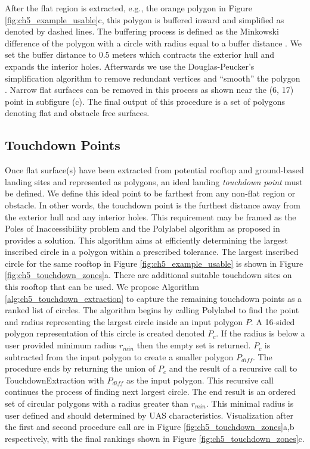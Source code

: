 After the flat region is extracted, e.g., the orange polygon in Figure \ref{fig:ch5_example_usable}c, this polygon is buffered inward and simplified as denoted by dashed lines. The buffering process is defined as the Minkowski difference of the polygon with a circle with radius equal to a buffer distance \cite{agarwal2002polygon}. We set the buffer distance to 0.5 meters which contracts the exterior hull and expands the interior holes.  Afterwards we use the Douglas-Peucker's simplification algorithm to remove redundant vertices and ``smooth'' the polygon \cite{douglas_algorithms_1973}.
Narrow flat surfaces can be removed in this process as shown near the (6, 17) point in subfigure (c). The final output of this procedure is a set of polygons denoting flat and obstacle free surfaces.

\subsection{Touchdown Points}\label{sec:ch5_method_circle}\label{sec:ch5_touchdown}
Once flat surface(s) have been extracted from potential rooftop and ground-based landing sites and represented as polygons, an ideal landing \emph{touchdown point} must be defined. We define this ideal point to be farthest from any non-flat region or obstacle. In other words, the touchdown point is the furthest distance away from the exterior hull and any interior holes. This requirement may be framed as the Poles of Inaccessibility problem \cite{garcia-castellanos_poles_2007} and the Polylabel algorithm as proposed in \cite{noauthor_github_2018-3} provides a solution. This algorithm aims at efficiently determining the largest inscribed circle in a polygon within a prescribed tolerance. The largest inscribed circle for the same rooftop in Figure \ref{fig:ch5_example_usable} is shown in Figure \ref{fig:ch5_touchdown_zones}a. 
There are additional suitable touchdown sites on this rooftop that can be used. We propose Algorithm \ref{alg:ch5_touchdown_extraction} to capture the remaining touchdown points as a ranked list of circles. The algorithm begins by calling Polylabel to find the point and radius representing the largest circle inside an input polygon $P$.  A 16-sided polygon representation of this circle is created denoted $P_c$. If the radius is below a user provided minimum radius $r_{min}$ then the empty set is returned. $P_c$ is subtracted from the input polygon to create a smaller polygon $P_{diff}$. The procedure ends by returning the union of $P_c$ and the result of a recursive call to TouchdownExtraction with $P_{diff}$ as the input polygon. This recursive call continues the process of finding next largest circle. The end result is an ordered set of circular polygons with a radius greater than $r_{min}$. This minimal radius is user defined and should determined by UAS characteristics. Visualization after the first and second procedure call are in Figure \ref{fig:ch5_touchdown_zones}a,b respectively, with the final rankings shown in Figure \ref{fig:ch5_touchdown_zones}c.

